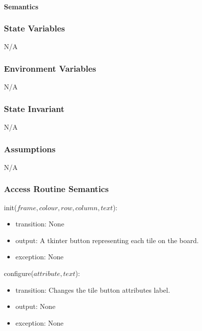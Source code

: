 \documentclass[12pt]{article}
\begin{document}
\paragraph* {Semantics}

\subsubsection*{State Variables}

N/A

\subsubsection*{Environment Variables}

N/A

\subsubsection*{State Invariant}

N/A

\subsubsection*{Assumptions}

N/A

\subsubsection* {Access Routine Semantics}

\noindent init($frame, colour, row, column, text$):
\begin{itemize}
\item transition: None
\item output: A tkinter button representing each tile on the board.
\item exception: None
\end{itemize}

\noindent configure($attribute, text$):
\begin{itemize}
\item transition: Changes the tile button attributes label.
\item output: None
\item exception: None
\end{itemize}
\end{document}
